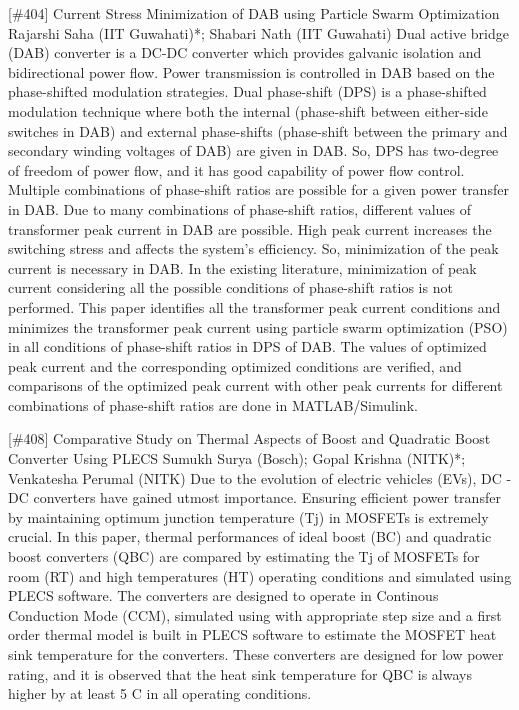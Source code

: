 {} \begin{abstract_online} {[\#404] Current Stress Minimization of DAB using Particle Swarm Optimization} {} {Rajarshi Saha (IIT Guwahati)*; Shabari Nath (IIT Guwahati)} {}  Dual active bridge (DAB) converter is a DC-DC converter which provides galvanic isolation and bidirectional power flow. Power transmission is controlled in DAB based on the phase-shifted modulation strategies. Dual phase-shift (DPS) is a phase-shifted modulation technique where both the internal (phase-shift between either-side switches in DAB) and external phase-shifts (phase-shift between the primary and secondary winding voltages of DAB) are given in DAB. So, DPS has two-degree of freedom of power flow, and it has good capability of power flow control. Multiple combinations of phase-shift ratios are possible for a given power transfer in DAB. Due to many combinations of phase-shift ratios, different values of transformer peak current in DAB are possible. High peak current increases the switching stress and affects the system's efficiency. So, minimization of the peak current is necessary in DAB. In the existing literature, minimization of peak current considering all the possible conditions of phase-shift ratios is not performed. This paper identifies all the transformer peak current conditions and minimizes the transformer peak current using particle swarm optimization (PSO) in all conditions of phase-shift ratios in DPS of DAB. The values of optimized peak current and the corresponding optimized conditions are verified, and comparisons of the optimized peak current with other peak currents for different combinations of phase-shift ratios are done in MATLAB/Simulink. \end{abstract_online} 
{} \begin{abstract_online} {[\#408]  Comparative Study on Thermal Aspects of Boost and Quadratic Boost Converter Using PLECS} {} {Sumukh Surya (Bosch); Gopal Krishna (NITK)*; Venkatesha Perumal (NITK)} {} Due to the evolution of electric vehicles (EVs), DC - DC converters have gained utmost importance. Ensuring efficient power transfer by maintaining optimum junction temperature (Tj) in MOSFETs is extremely crucial. In this paper, thermal performances of ideal boost (BC) and quadratic boost converters (QBC) are compared by estimating the Tj of MOSFETs for room (RT) and high temperatures (HT) operating conditions and simulated using PLECS software. The converters are designed to operate in Continous Conduction Mode (CCM), simulated using with appropriate step size and a first order thermal model is built in PLECS software to estimate the MOSFET heat sink temperature for the converters. These converters are designed for low power rating, and it is observed that the heat sink temperature for QBC is always higher by at least 5 C in all operating conditions. \end{abstract_online} 
